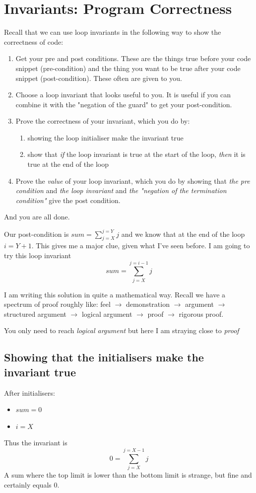 \documentclass[twoside=false,DIV=14]{scrartcl}
\begin{document}
\section{Invariants: Program Correctness}
Recall that we can use loop invariants in the following way to show the correctness of code:
\begin{enumerate}
\item Get your pre and post conditions.  These are the things true before your code snippet (pre-condition) and the thing you want to be true after your code snippet (post-condition).  These often are given to you.
\item Choose a loop invariant that looks useful to you.  It is useful if you can combine it with the "negation of the guard" to get your post-condition.
\item Prove the correctness of your invariant, which you do by:
\begin{enumerate}
\item showing the loop initialiser make the invariant true
\item show that \emph{if} the loop invariant is true at the start of the loop, \emph{then} it is true at the end of the loop
\end{enumerate}
\item Prove the \emph{value} of your loop invariant, which you do by showing that \emph{the pre condition} and \emph{the loop invariant} and \emph{the "negation of the termination condition"} give the post condition.
\end{enumerate}
And you are all done.

Our post-condition is $sum = \sum_{j = X}^{j=Y}j$ and we know that at the end of the loop $i = Y + 1$.  This gives me a major clue, given what I've seen before.  I am going to try this loop invariant
$$
sum = \sum_{j = X}^{j = i -1}j
$$

\begin{note}
I am writing this solution in quite a mathematical way.  Recall we have a spectrum of proof roughly like: feel $\rightarrow$ demonstration $\rightarrow$ argument $\rightarrow$ structured argument $\rightarrow$ logical argument $\rightarrow$ proof $\rightarrow$ rigorous proof.

You only need to reach \emph{logical argument} but here I am straying close to \emph{proof}
\end{note}
\subsection{Showing that the initialisers make the invariant true}
After initialisers:
\begin{itemize}
\item $sum = 0$
\item $i = X$
\end{itemize}
Thus the invariant is
$$
0 = \sum_{j = X}^{j = X-1}j
$$
A sum where the top limit is lower than the bottom limit is strange, but fine and certainly equals 0.
\end{document}
